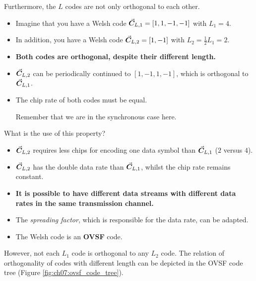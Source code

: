 \begin{refsection}
Furthermore, the $L$ codes are not only orthogonal to each other.
\begin{itemize}
	\item Imagine that you have a Welsh code $\vec{\bm{C}}_{L,1} = \left[1, 1, -1, -1\right]$ with $L_1 = 4$.
	\item In addition, you have a Welsh code $\vec{\bm{C}}_{L,2} = \left[1, -1\right]$ with $L_2 = \frac{1}{2} L_1 = 2$.
	\item \textbf{Both codes are orthogonal, despite their different length.}
	\item $\vec{\bm{C}}_{L,2}$ can be periodically continued to $\left[1, -1, 1, -1\right]$, which is orthogonal to $\vec{\bm{C}}_{L,1}$.
	\item The chip rate of both codes must be equal. \begin{remark}Remember that we are in the synchronous case here.\end{remark}
\end{itemize}

What is the use of this property?
\begin{itemize}
	\item $\vec{\bm{C}}_{L,2}$ requires less chips for encoding one data symbol than $\vec{\bm{C}}_{L,1}$ ($2$ versus $4$).
	\item $\vec{\bm{C}}_{L,2}$ has the double data rate than $\vec{\bm{C}}_{L,1}$, whilst the chip rate remains constant.
	\item \textbf{It is possible to have different data streams with different data rates in the same transmission channel.}
	\item The \emph{spreading factor}, which is responsible for the data rate, can be adapted.
	\item The Welsh code is an  \textbf{\acf{OVSF}} code.
\end{itemize}

However, not each $L_1$ code is orthogonal to any $L_2$ code. The relation of orthogonality of codes with different length can be depicted in the \acs{OVSF} code tree (Figure \ref{fig:ch07:ovsf_code_tree}).
\begin{figure}[H]
	\centering
\end{figure}
\end{refsection}
